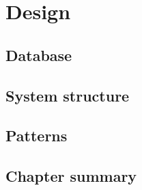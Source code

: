\chapter{Design}
\label{chap:Design}

\section{Database}
\label{sec:Database}

\section{System structure}
\label{sec:System structure}

\section{Patterns}
\label{sec:Patterns}

\section{Chapter summary}
\label{sec:Chapter summary}
